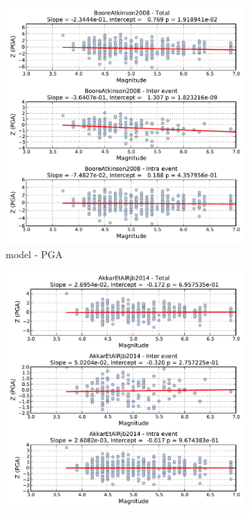 \begin{figure}[htb]
  \centering
  \begin{subfigure}[b]{0.49\textwidth}
      \includegraphics[width=\textwidth]{./figures/residuals/BA2008_Magnitude_PGA.pdf}
      \caption{\cite{boore2008} model - PGA}
      \label{fig:pga_mag_ba2008}
  \end{subfigure}
    \begin{subfigure}[b]{0.49\textwidth}
      \includegraphics[width=\textwidth]{./figures/residuals/Akkar2014_Magnitude_PGA.pdf}

\end{subfigure}
\end{figure}
